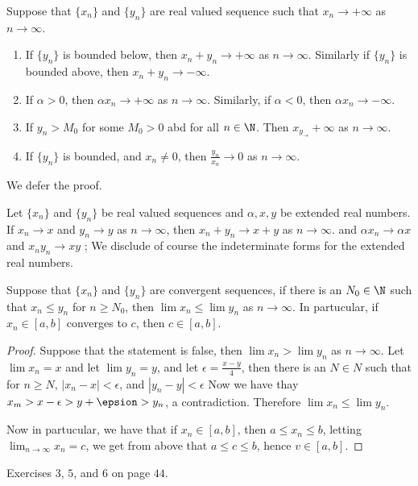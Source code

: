 \begin{theorem}\label{2.2.4}

    Suppose that $\{x_n\}$ and  $\{y_n\}$ are real valued sequence such that  $x_n \rightarrow +\infty$ as $n \rightarrow \infty$.
        \begin{enumerate}[label=(\arabic*)]
            \item If $\{y_n\}$ is bounded below, then  $x_n+y_n \rightarrow +\infty$ as  $n \rightarrow \infty$. Similarly 
                if $\{y_n\}$ is bounded above, then  $x_n+y_n \rightarrow -\infty$.

            \item If $\alpha>0$, then  $\alpha x_n \rightarrow +\infty$ as  $n \rightarrow \infty$. Similarly, if  $\alpha<0$, 
                then  $\alpha x_n \rightarrow -\infty$.

            \item If  $y_n>M_0$ for some $M_0>0$ abd for all $n \in \N$. Then  $x_y_ \rightarrow  +\infty$ as  $n \rightarrow \infty$.

            \item If  $\{y_n\}$ is bounded, and $x_n \neq 0$, then  $ \frac{y_n}{x_n} \rightarrow 0$ as $n \rightarrow \infty$.
        \end{enumerate}
\end{theorem}
We defer the proof.

\begin{corollary} 
    Let $\{x_n\}$ and  $\{y_n\}$ be real valued sequences and  $\alpha, x, y$ be extended real numbers. If  $x_n \rightarrow x$ 
    and  $y_n \rightarrow y$ as  $n \rightarrow \infty$, then  $x_n+y_n \rightarrow x+y$ as  $n \rightarrow \infty$. and 
    $\alpha x_n \rightarrow \alpha x$ and $x_ny_n \rightarrow xy$ ; We disclude of course the indeterminate forms for the 
    extended real numbers.
\end{corollary}

\begin{theorem}\label{2.2.5}

    Suppose that $\{x_n\}$ and  $\{y_n\}$ are convergent sequences, if there is an  $N_0 \in \N$ such that $x_n \leq y_n$ 
    for $n \geq N_0$, then $\lim{x_n} \leq \lim{y_n}$ as $n \rightarrow \infty$. In partucular, if $x_n \in [a,b]$ converges 
    to $c$, then  $c \in [a,b]$.
\end{theorem}
\begin{proof}
    Suppose that the statement is false, then $\lim{x_n}>\lim{y_n}$ as  $n \rightarrow \infty$. Let  $\lim{x_n}=x$ and let  
    $\lim{y_n}=y$, and let $\epsilon=\frac{x-y}{4}$, then there is an $N \in N$ such that for  $n \geq N$,  $|x_n-x|<\epsilon$, 
    and $|y_n-y|<\epsilon$ Now we have thay  $x_m>x-\epsilon>y+\epsion>y_n$, a contradiction. Therefore  $\lim{x_n} \leq 
    \lim{y_n}$.

    Now in partucular, we have that if $x_n \in[a,b]$, then  $a \leq x_n \leq b$, letting  $\lim_{n \rightarrow \infty}{x_n} 
    =c$, we get from above that  $a \leq c \leq b$, hence  $v \in [a,b]$.
\end{proof}

\begin{HW} 
    Exercises $3$,  $5$,  and $6$ on page $ 44$.
\end{HW}
